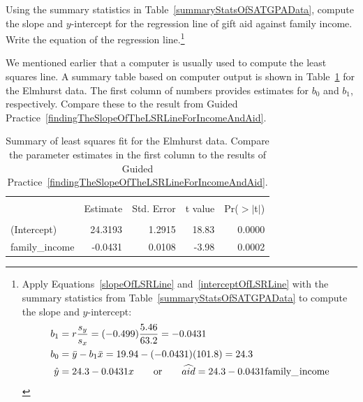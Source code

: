 \begin{exercise} \label{findingTheSlopeOfTheLSRLineForIncomeAndAid}
Using the summary statistics in Table~\ref{summaryStatsOfSATGPAData}, compute the slope and $y$-intercept for the regression line of gift aid against family income. Write the equation of the regression line.\footnote{Apply Equations~\eqref{slopeOfLSRLine} and~\eqref{interceptOfLSRLine} with the summary statistics from Table~\ref{summaryStatsOfSATGPAData} to compute the slope and $y$-intercept:
\begin{align*}
b_1 &= r\frac{s_y}{s_x} = (-0.499)\frac{5.46}{63.2} = -0.0431 \\
b_0 & = \bar{y} - b_1\bar{x} = 19.94 - (-0.0431)(101.8) = 24.3\\
\hat{y}&=24.3 - 0.0431x
	\qquad\text{or}\qquad
	\widehat{aid} = 24.3 - 0.0431 \text{family\_\hspace{0.3mm}income}
\end{align*}\vspace{-3mm}}
\end{exercise}

We mentioned earlier that a computer is usually used to compute the least squares line. A summary table based on computer output is shown in Table~\ref{rOutputForIncomeAidLSRLine} for the Elmhurst data. The first column of numbers provides estimates for ${b}_0$ and ${b}_1$, respectively. Compare these to the result from Guided Practice~\ref{findingTheSlopeOfTheLSRLineForIncomeAndAid}.

\begin{table}[ht]
\centering
\begin{tabular}{l rrrr}
  \hline
  \vspace{-3.7mm} & & & & \\
 & Estimate & Std. Error & t value & Pr($>$$|$t$|$) \\ 
  \hline
  \vspace{-3.6mm} & & & & \\
(Intercept) & 24.3193 & 1.2915 & 18.83 & 0.0000 \\ 
family\_\hspace{0.3mm}income & -0.0431 & 0.0108 & -3.98 & 0.0002 \\ 
  \hline
\end{tabular}
\caption{Summary of least squares fit for the Elmhurst data. Compare the parameter estimates in the first column to the results of Guided Practice~\ref{findingTheSlopeOfTheLSRLineForIncomeAndAid}.}
\label{rOutputForIncomeAidLSRLine}
\end{table}

